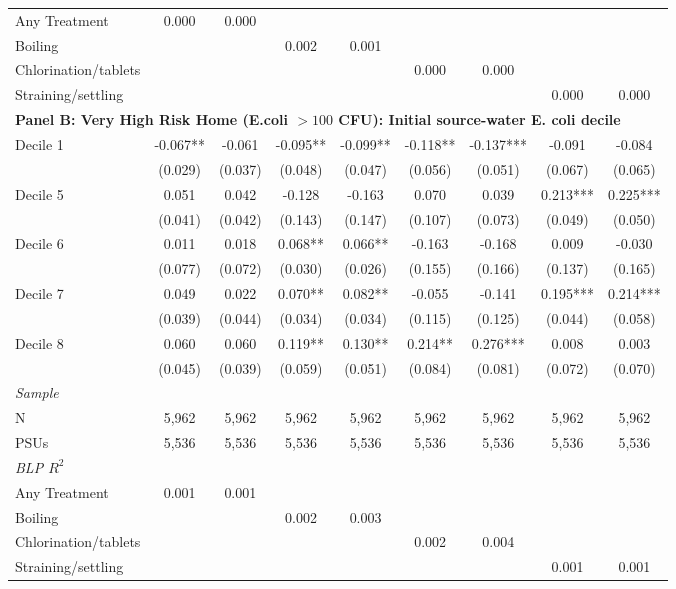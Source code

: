 \begin{landscape}
\begin{table}[p]
\begin{adjustbox}{max width=\linewidth, center}
\begin{tabular}{lcccccccc}
\quad Any Treatment & 0.000 & 0.000 &  &  &  &  &  &  \\
\quad Boiling &  &  & 0.002 & 0.001 &  &  &  &  \\
\quad Chlorination/tablets &  &  &  &  & 0.000 & 0.000 &  &  \\
\quad Straining/settling &  &  &  &  &  &  & 0.000 & 0.000 \\
\midrule
\multicolumn{9}{l}{\textbf{Panel B: Very High Risk Home (E.coli $>100$ CFU): Initial source-water E. coli decile}} \\
Decile 1 & -0.067** & -0.061 & -0.095** & -0.099** & -0.118** & -0.137*** & -0.091 & -0.084 \\
 & (0.029) & (0.037) & (0.048) & (0.047) & (0.056) & (0.051) & (0.067) & (0.065) \\
Decile 5 & 0.051 & 0.042 & -0.128 & -0.163 & 0.070 & 0.039 & 0.213*** & 0.225*** \\
 & (0.041) & (0.042) & (0.143) & (0.147) & (0.107) & (0.073) & (0.049) & (0.050) \\
Decile 6 & 0.011 & 0.018 & 0.068** & 0.066** & -0.163 & -0.168 & 0.009 & -0.030 \\
 & (0.077) & (0.072) & (0.030) & (0.026) & (0.155) & (0.166) & (0.137) & (0.165) \\
Decile 7 & 0.049 & 0.022 & 0.070** & 0.082** & -0.055 & -0.141 & 0.195*** & 0.214*** \\
 & (0.039) & (0.044) & (0.034) & (0.034) & (0.115) & (0.125) & (0.044) & (0.058) \\
Decile 8 & 0.060 & 0.060 & 0.119** & 0.130** & 0.214** & 0.276*** & 0.008 & 0.003 \\
 & (0.045) & (0.039) & (0.059) & (0.051) & (0.084) & (0.081) & (0.072) & (0.070) \\
\multicolumn{9}{l}{\textit{Sample}} \\
\quad N & 5,962 & 5,962 & 5,962 & 5,962 & 5,962 & 5,962 & 5,962 & 5,962 \\
\quad PSUs & 5,536 & 5,536 & 5,536 & 5,536 & 5,536 & 5,536 & 5,536 & 5,536 \\
\multicolumn{9}{l}{\textit{BLP $R^{2}$}} \\
\quad Any Treatment & 0.001 & 0.001 &  &  &  &  &  &  \\
\quad Boiling &  &  & 0.002 & 0.003 &  &  &  &  \\
\quad Chlorination/tablets &  &  &  &  & 0.002 & 0.004 &  &  \\
\quad Straining/settling &  &  &  &  &  &  & 0.001 & 0.001 \\

\end{tabular}
\end{adjustbox}
\end{table}
\end{landscape}
